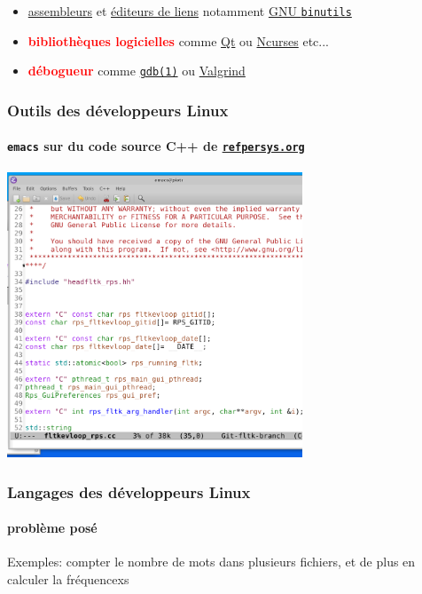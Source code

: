 \documentclass[xcolor=svgnames,final,smaller,a4]{beamer}
\begin{document}
\begin{frame}
\begin{relsize}{-1}
\begin{itemize}
    
    \item \href{https://fr.wikipedia.org/wiki/Programme_assembleur}{assembleurs} et \href{https://fr.wikipedia.org/wiki/Édition_de_liens}{éditeurs de liens} notamment \href{https://fr.wikipedia.org/wiki/GNU\_Binutils}{GNU \texttt{binutils}} 
    
    \item  \textbf{\textcolor{red}{bibliothèques logicielles}} comme \href{https://qt.io}{Qt} ou \href{https://fr.wikipedia.org/wiki/Ncurses}{Ncurses} etc...
      
    \item  \textbf{\textcolor{red}{débogueur}} comme 
    \href{https://man7.org/linux/man-pages/man1/gdb.1.html}{\texttt{gdb(1)}} ou \href{https://fr.wikipedia.org/wiki/Valgrind}{Valgrind}
      
  \end{itemize}
  \end{relsize}
\end{frame}

\begin{frame}
  \frametitle{Outils des développeurs Linux}
  \framesubtitle{\texttt{emacs} sur du code source C++ de \href{http://refpersys.org/}{\texttt{refpersys.org}}}

  \vspace{0.1cm}
  
    \includegraphics[width=0.66\textwidth]{emacs-refpersys} 
\end{frame}

\begin{frame}
  \frametitle{Langages des développeurs Linux}
  \framesubtitle{problème posé}

  Exemples: compter le nombre de mots dans plusieurs fichiers, et de plus en calculer la fréquencexs
\end{frame}
\end{document}
